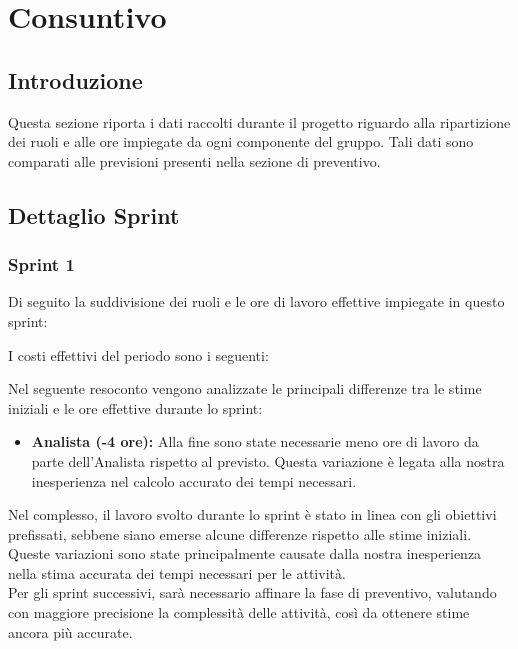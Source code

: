 \section{Consuntivo}
\subsection{Introduzione}
Questa sezione riporta i dati raccolti durante il progetto riguardo alla ripartizione dei ruoli e alle ore impiegate da ogni componente del gruppo. Tali dati sono comparati alle previsioni presenti nella sezione di preventivo.

\subsection{Dettaglio Sprint}

\subsubsection{Sprint 1}
Di seguito la suddivisione dei ruoli e le ore di lavoro effettive impiegate in questo sprint:




I costi effettivi del periodo sono i seguenti:




Nel seguente resoconto vengono analizzate le principali differenze tra le stime iniziali e le ore effettive durante lo sprint:
\begin{itemize}
    \item \textbf{Analista (-4 ore):} Alla fine sono state necessarie meno ore di lavoro da parte 
    dell'Analista rispetto al previsto. Questa variazione è legata alla nostra inesperienza nel calcolo 
    accurato dei tempi necessari.

\end{itemize}
Nel complesso, il lavoro svolto durante lo sprint è stato in linea con gli obiettivi prefissati, sebbene 
siano emerse alcune differenze rispetto alle stime iniziali. Queste variazioni sono state principalmente 
causate dalla nostra inesperienza nella stima accurata dei tempi necessari per le attività.
\\
Per gli sprint successivi, sarà necessario affinare la fase di preventivo, valutando con 
maggiore precisione la complessità delle attività, così da ottenere stime ancora più accurate.